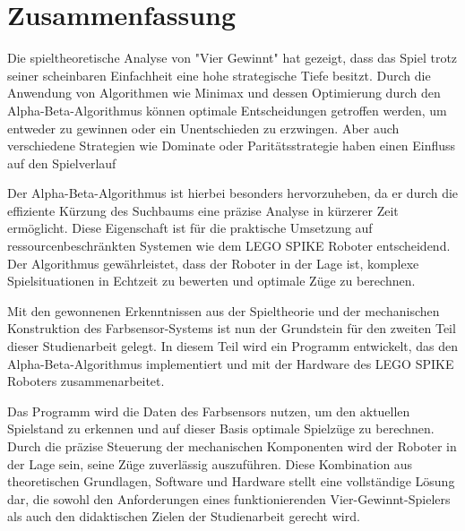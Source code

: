 \chapter{Zusammenfassung}


Die spieltheoretische Analyse von "Vier Gewinnt" hat gezeigt, dass das Spiel trotz seiner scheinbaren Einfachheit eine hohe strategische Tiefe besitzt. Durch die Anwendung von Algorithmen wie Minimax und dessen Optimierung durch den Alpha-Beta-Algorithmus können optimale Entscheidungen getroffen werden, um entweder zu gewinnen oder ein Unentschieden zu erzwingen. Aber auch verschiedene Strategien wie Dominate oder Paritätsstrategie haben einen Einfluss auf den Spielverlauf

Der Alpha-Beta-Algorithmus ist hierbei besonders hervorzuheben, da er durch die effiziente Kürzung des Suchbaums eine präzise Analyse in kürzerer Zeit ermöglicht. Diese Eigenschaft ist für die praktische Umsetzung auf ressourcenbeschränkten Systemen wie dem LEGO SPIKE Roboter entscheidend. Der Algorithmus gewährleistet, dass der Roboter in der Lage ist, komplexe Spielsituationen in Echtzeit zu bewerten und optimale Züge zu berechnen.

Mit den gewonnenen Erkenntnissen aus der Spieltheorie und der mechanischen Konstruktion des Farbsensor-Systems ist nun der Grundstein für den zweiten Teil dieser Studienarbeit gelegt. In diesem Teil wird ein Programm entwickelt, das den Alpha-Beta-Algorithmus implementiert und mit der Hardware des LEGO SPIKE Roboters zusammenarbeitet. 

Das Programm wird die Daten des Farbsensors nutzen, um den aktuellen Spielstand zu erkennen und auf dieser Basis optimale Spielzüge zu berechnen. Durch die präzise Steuerung der mechanischen Komponenten wird der Roboter in der Lage sein, seine Züge zuverlässig auszuführen. Diese Kombination aus theoretischen Grundlagen, Software und Hardware stellt eine vollständige Lösung dar, die sowohl den Anforderungen eines funktionierenden Vier-Gewinnt-Spielers als auch den didaktischen Zielen der Studienarbeit gerecht wird.
